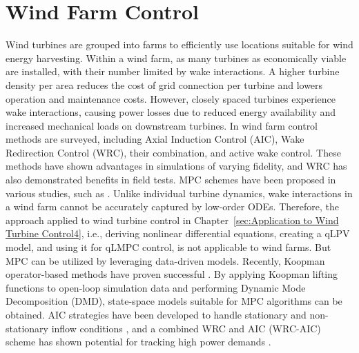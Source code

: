 \chapter{Wind Farm Control} \label{sec:ApplicationtoWindFarmControl}

Wind turbines are grouped into farms to efficiently use locations suitable for wind energy harvesting. Within a wind farm, as many turbines as economically viable are installed, with their number limited by wake interactions. A higher turbine density per area reduces the cost of grid connection per turbine and lowers operation and maintenance costs. However, closely spaced turbines experience wake interactions, causing power losses due to reduced energy availability and increased mechanical loads on downstream turbines.
In \cite{houck2022review} wind farm control methods are surveyed, including Axial Induction Control (AIC), Wake Redirection Control (WRC), their combination, and active wake control. These methods have shown advantages in simulations of varying fidelity, and WRC has also demonstrated benefits in field tests. MPC schemes have been proposed in various studies, such as \cite{spudic2014distMPC_https://doi.org/10.1002/oca.2136, zhao2016coordinated, bay2018active, vali2019adjoint}. Unlike individual turbine dynamics, wake interactions in a wind farm cannot be accurately captured by low-order ODEs. Therefore, the approach applied to wind turbine control in Chapter~\ref{sec:Application to Wind Turbine Control4}, i.e., deriving nonlinear differential equations, creating a qLPV model, and using it for qLMPC control, is not applicable to wind farms. But MPC can be utilized by leveraging data-driven models. Recently, Koopman operator-based methods have proven successful \cite{castillo2020wind, cassamo2021model}. By applying Koopman lifting functions to open-loop simulation data and performing Dynamic Mode Decomposition (DMD), state-space models suitable for MPC algorithms can be obtained. AIC strategies have been developed to handle stationary \cite{sharan2022Koopman} and non-stationary inflow conditions \cite{dittmer2022data}, and a combined WRC and AIC (WRC-AIC) scheme has shown potential for tracking high power demands \cite{dittmer2023koopman}.
%

